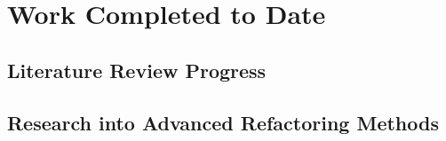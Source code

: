 \section{Work Completed to Date}

\subsection*{Literature Review Progress}

\subsection*{Research into Advanced Refactoring Methods}
